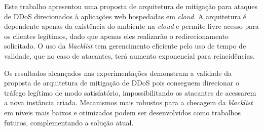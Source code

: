 
Este trabalho apresentou uma proposta de arquitetura de mitigação para ataques de DDoS direcionados à aplicações web hospedadas em \emph{cloud}. A arquitetura é dependente apenas da existência do ambiente na \emph{cloud} e permite livre acesso para os clientes legítimos, dado que apenas eles realizarão o redirecionamento solicitado. O uso da \emph{blacklist} tem gerencimento eficiente pelo uso de tempo de validade, que no caso de atacantes, terá aumento exponencial para reincidências.

Os resultados alcançados nas experimentações demonstram a validade da proposta de arquitetura de mitigação de DDoS pois conseguem direcionar o tráfego legítimo de modo satisfatório, impossibilitando os atacantes de acessarem a nova instância criada. Mecanismos mais robustos para a checagem da \emph{blacklist} em níveis mais baixos e otimizados podem ser desenvolvidos como trabalhos futuros, complementando a solução atual.

